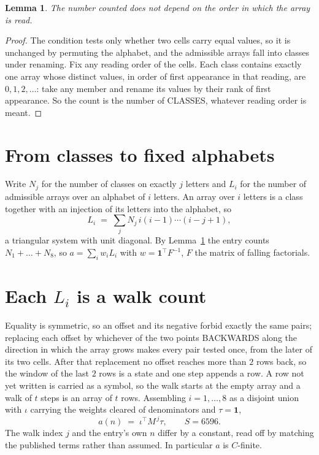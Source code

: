 \documentclass[11pt,a4paper]{article}
\theoremstyle{plain}
\newtheorem{lemma}[theorem]{Lemma}
\theoremstyle{definition}
\begin{document}
\begin{lemma}\label{lem:order}
The number counted does not depend on the order in which the array is read.
\end{lemma}

\begin{proof}
The condition tests only whether two cells carry equal values, so it is unchanged by permuting
the alphabet, and the admissible arrays fall into classes under renaming. Fix any reading order
of the cells. Each class contains exactly one array whose distinct values, in order of first
appearance in that reading, are $0,1,2,\dots$: take any member and rename its values by their
rank of first appearance. So the count is the number of CLASSES, whatever reading order is
meant.
\end{proof}

\section{From classes to fixed alphabets}

Write $N_j$ for the number of classes on exactly $j$ letters and $L_i$ for the number of
admissible arrays over an alphabet of $i$ letters. An array over $i$ letters is a class together
with an injection of its letters into the alphabet, so
\[
L_i\;=\;\sum_j N_j\,i(i-1)\cdots(i-j+1),
\]
a triangular system with unit diagonal. By Lemma~\ref{lem:order} the entry counts
$N_1+\dots+N_{8}$, so $a=\sum_i w_iL_i$ with $w=\mathbf{1}^{\!\top}F^{-1}$, $F$ the
matrix of falling factorials.

\section{Each $L_i$ is a walk count}

Equality is symmetric, so an offset and its negative forbid exactly the same pairs; replacing
each offset by whichever of the two points BACKWARDS along the direction in which the array
grows makes every pair tested once, from the later of its two cells. After that replacement no
offset reaches more than $2$ rows back, so the window of the last $2$
rows is a state and one step appends a row. A row not yet written is
carried as a symbol, so the walk starts at the empty array and a walk of $t$ steps is an array
of $t$ rows. Assembling $i=1,\dots,8$ as a disjoint union with $\iota$ carrying the
weights cleared of denominators and $\tau=\mathbf{1}$,
\[
a(n)\;=\;\iota^{\!\top}M^{\,j}\tau ,\qquad S=6596.
\]
The walk index $j$ and the entry's own $n$ differ by a constant, read off by matching the
published terms rather than assumed. In particular $a$ is $C$-finite.
\end{document}
